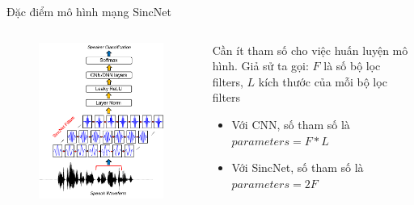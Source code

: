 \documentclass[notheorems, aspectratio=54]{beamer}
\begin{document}
\begin{frame}{Đặc điểm mô hình mạng SincNet}
	\begin{columns}
		\begin{column}{0.47\textwidth}
			\begin{figure}[H]
				\includegraphics[width=0.9\linewidth]{images/SincNet.png}
			\end{figure}
		\end{column}
		\begin{column}{0.5\textwidth}
			Cần ít tham số cho việc huấn luyện mô hình. \newline
			Giả sử ta gọi: $F$ là số bộ lọc filters, $L$ kích thước của mỗi bộ lọc  filters
			\begin{itemize}
				\item Với CNN, số tham số là $parameters = F * L$
				\item Với SincNet, số tham số là $parameters = 2F$
			\end{itemize}
		\end{column}
	\end{columns}
\end{frame}
\end{document}
